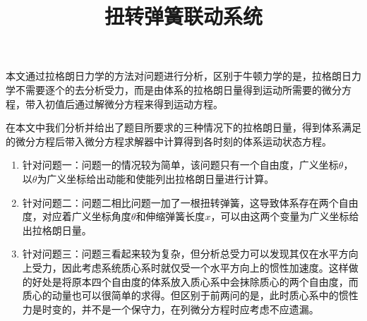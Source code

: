 \documentclass[a4paper,c5size,twoside,UTF8]{ctexart} %
\numberwithin{equation}{section}   %
\begin{document}
	
	
	
	\renewcommand{\abstractname}{} 
	
	
   \title{扭转弹簧联动系统\vspace{-2em}}


   \date{}
   \maketitle
   
   
   
   
   \vspace{1em}
   \begin{center}
   \bfseries{}
   \end{center}
   \par
   
   本文通过拉格朗日力学的方法对问题进行分析，区别于牛顿力学的是，拉格朗日力学不需要逐个的去分析受力，而是由体系的拉格朗日量得到运动所需要的微分方程，带入初值后通过解微分方程来得到运动方程。
   
   在本文中我们分析并给出了题目所要求的三种情况下的拉格朗日量，得到体系满足的微分方程后带入微分方程求解器中计算得到各时刻的体系运动状态方程。
   
   \begin{enumerate}[itemsep=0pt,parsep=0pt]
   \item 针对问题一：问题一的情况较为简单，该问题只有一个自由度，广义坐标$\theta$，以$\theta$为广义坐标给出动能和使能列出拉格朗日量进行计算。
   \item 针对问题二：问题二相比问题一加了一根扭转弹簧，这导致体系存在两个自由度，对应着广义坐标角度$\theta$和伸缩弹簧长度$x$，可以由这两个变量为广义坐标给出拉格朗日量。
   \item 针对问题三：问题三看起来较为复杂，但分析总受力可以发现其仅在水平方向上受力，因此考虑系统质心系时就仅受一个水平方向上的惯性加速度。这样做的好处是将原本四个自由度的体系放入质心系中会抹除质心的两个自由度，而质心的动量也可以很简单的求得。但区别于前两问的是，此时质心系中的惯性力是时变的，并不是一个保守力，在列微分方程时应考虑不应遗漏。
   \end{enumerate}
   
\end{document}
